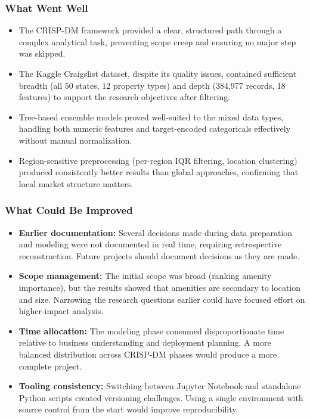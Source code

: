 \subsubsection{What Went Well}
\vspace{-9pt}
\begin{itemize}[itemsep=-9pt]
    \item The CRISP-DM framework provided a clear, structured path through a complex analytical task, preventing scope creep and ensuring no major step was skipped.
    \item The Kaggle Craigslist dataset, despite its quality issues, contained sufficient breadth (all 50 states, 12 property types) and depth (384,977 records, 18 features) to support the research objectives after filtering.
    \item Tree-based ensemble models proved well-suited to the mixed data types, handling both numeric features and target-encoded categoricals effectively without manual normalization.
    \item Region-sensitive preprocessing (per-region IQR filtering, location clustering) produced consistently better results than global approaches, confirming that local market structure matters.
\end{itemize}

\subsubsection{What Could Be Improved}
\vspace{-9pt}
\begin{itemize}[itemsep=-9pt]
    \item \textbf{Earlier documentation:} Several decisions made during data preparation and modeling were not documented in real time, requiring retrospective reconstruction. Future projects should document decisions as they are made.
    \item \textbf{Scope management:} The initial scope was broad (ranking amenity importance), but the results showed that amenities are secondary to location and size. Narrowing the research questions earlier could have focused effort on higher-impact analysis.
    \item \textbf{Time allocation:} The modeling phase consumed disproportionate time relative to business understanding and deployment planning. A more balanced distribution across CRISP-DM phases would produce a more complete project.
    \item \textbf{Tooling consistency:} Switching between Jupyter Notebook and standalone Python scripts created versioning challenges. Using a single environment with source control from the start would improve reproducibility.
\end{itemize}

